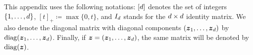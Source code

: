 This appendix uses the following notations: $[d]$ denotes the set of integers $\{1, \hdots, d\}$,  $[t]_+\coloneqq\max\{0,t\}$, and $I_d$ stands for the $d\times d$ identity matrix. We also denote the diagonal matrix with diagonal components $(\boldsymbol{z}_1,\hdots,\boldsymbol{z}_d)$ by $\mathrm{diag}(\boldsymbol{z}_1,\hdots,\boldsymbol{z}_d)$. Finally, if $\boldsymbol{z} = (\boldsymbol{z}_1,\hdots,\boldsymbol{z}_d)$, the same matrix will be denoted by $\mathrm{diag}(\boldsymbol{z})$.